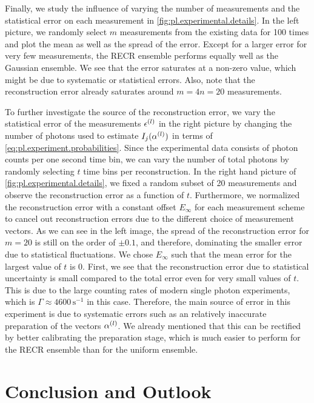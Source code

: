 Finally, we study the influence of varying the number of measurements and the statistical error on each measurement in \cref{fig:pl.experimental.details}.
In the left picture, we randomly select $m$ measurements from the existing data for 100 times and plot the mean as well as the spread of the error.
Except for a larger error for very few measurements, the RECR ensemble performs equally well as the Gaussian ensemble.
We see that the error saturates at a non-zero value, which might be due to systematic or statistical errors.
Also, note that the reconstruction error already saturates around $m = 4n = 20$ measurements.

To further investigate the source of the reconstruction error, we vary the statistical error of the measurements $\epsilon^{(l)}$ in the right picture by changing the number of photons used to estimate $I_j(\alpha^{(l)})$ in terms of \cref{eq:pl.experiment.probabilities}.
Since the experimental data consists of photon counts per one second time bin, we can vary the number of total photons by randomly selecting $t$ time bins per reconstruction.
In the right hand picture of \cref{fig:pl.experimental.details}, we fixed a random subset of 20 measurements and observe the reconstruction error as a function of $t$.
Furthermore, we normalized the reconstruction error with a constant offset $E_\infty$ for each measurement scheme to cancel out reconstruction errors due to the different choice of measurement vectors.
As we can see in the left image, the spread of the reconstruction error for $m=20$ is still on the order of $\pm 0.1$, and therefore, dominating the smaller error due to statistical fluctuations.
We chose $E_\infty$ such that the mean error for the largest value of $t$ is 0.
First, we see that the reconstruction error due to statistical uncertainty is small compared to the total error even for very small values of $t$.
This is due to the large counting rates of modern single photon experiments, which is $\Gamma \approx 4600\,\mathrm{s}^{-1}$ in this case.
Therefore, the main source of error in this experiment is due to systematic errors such as an relatively inaccurate preparation of the vectors $\alpha^{(l)}$.
We already mentioned that this can be rectified by better calibrating the preparation stage, which is much easier to perform for the RECR ensemble than for the uniform ensemble.


\section{Conclusion and Outlook}

